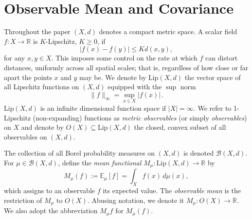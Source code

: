 \documentclass[11pt]{article}
\theoremstyle{definition}
\newcommand{\real}{\ensuremath{\mathbb{R}}}
\newcommand{\lip}{\ensuremath{\text{Lip}}}
\newcommand{\obs}[1]{\ensuremath{O(#1)}}
\newcommand{\borel}{\ensuremath{\mathcal{B}}}
\begin{document}

\section{Observable Mean and Covariance} \label{S:obs}

Throughout the paper $(X,d)$ denotes a compact metric space. A scalar field $f \colon X \to \real$ is $K$-Lipschitz, $K \geq 0$, if 
\begin{equation}
|f(x) - f(y)| \leq K d(x,y),
\label{E:lip}
\end{equation}
for any $x,y \in X$. This imposes some control on the rate at which $f$ can distort distances, uniformly across all spatial scales; that is, regardless of how close or far apart the points $x$ and $y$ may be. We denote by $\lip (X,d)$ the vector space of all Lipschitz functions on $(X,d)$ equipped with the $\sup$ norm
\begin{equation}
\|f\|_\infty = \sup_{x \in X} |f(x)| \,.
\end{equation}
$\lip (X,d)$ is an infinite dimensional function space if $|X| = \infty$. We refer to 1-Lipschitz (non-expanding) functions as {\em metric observables} (or simply {\em observables}) on $X$ and denote by $\obs{X} \subseteq \lip (X,d)$ the closed, convex  subset of all observables on $(X,d)$.

The collection of all Borel probability measures on $(X,d)$ is denoted $\borel (X,d)$. For $\mu \in \borel (X,d)$, define the {\em mean functional} $M_\mu \colon \lip (X,d) \to \real$ by
\begin{equation}
M_\mu (f) := \mathbb{E}_\mu[f] = \int_X f(x) \, d\mu (x),
\end{equation}
which assigns to an observable $f$ its expected value. The {\em observable mean} is the restriction of $M_\mu$ to $\obs {X}$. Abusing notation, we denote it $M_\mu \colon \obs{X} \to \real$. We also adopt the abbreviation $M_\mu f$ for $M_\mu(f)$.
\end{document}

